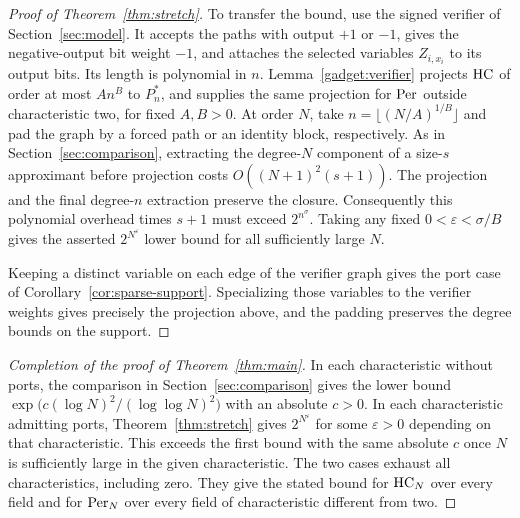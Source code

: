\begin{proof}[Proof of Theorem~\ref{thm:stretch}]
To transfer the bound, use the signed verifier of
Section~\ref{sec:model}. It accepts the paths with output $+1$ or
$-1$, gives the negative-output bit weight $-1$, and attaches the
selected variables $Z_{i,x_i}$ to its output bits. Its length is
polynomial in $n$. Lemma~\ref{gadget:verifier} projects $\mathrm{HC}$ of order
at most $A n^B$ to $P_n^*$, and supplies the same projection for
$\mathrm{Per}$ outside characteristic two, for fixed $A,B>0$. At order $N$,
take $n=\lfloor(N/A)^{1/B}\rfloor$ and pad the graph by a forced path
or an identity block, respectively. As in Section~\ref{sec:comparison},
extracting the degree-$N$ component of a size-$s$ approximant before
projection costs $O((N+1)^2(s+1))$. The projection and the final
degree-$n$ extraction preserve the closure. Consequently this polynomial
overhead times $s+1$ must exceed $2^{n^\sigma}$. Taking any fixed
$0<\varepsilon<\sigma/B$ gives the asserted $2^{N^\varepsilon}$
lower bound for all sufficiently large $N$.

Keeping a distinct variable on each edge of the verifier graph gives
the port case of Corollary~\ref{cor:sparse-support}. Specializing those
variables to the verifier weights gives precisely the projection above,
and the padding preserves the degree bounds on the support.
\end{proof}

\begin{proof}[Completion of the proof of Theorem~\ref{thm:main}]
In each characteristic without ports, the comparison in
Section~\ref{sec:comparison} gives the lower bound
$\exp\bigl(c(\log N)^2/(\log\log N)^2\bigr)$ with an absolute $c>0$.
In each characteristic admitting ports, Theorem~\ref{thm:stretch}
gives $2^{N^\varepsilon}$ for some $\varepsilon>0$ depending on that
characteristic. This exceeds the first bound with the same absolute
$c$ once $N$ is sufficiently large in the given characteristic.
The two cases exhaust all characteristics, including zero. They give
the stated bound for $\mathrm{HC}_N$ over every field and for $\mathrm{Per}_N$ over
every field of characteristic different from two.
\end{proof}
